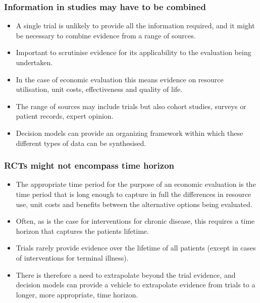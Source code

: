 \begin{frame}
\frametitle{Information in studies may have to be combined}
	\begin{itemize}
		\item A single trial is unlikely to provide all the information required, and it might be necessary to combine evidence from a \alert{range of sources}.
		\item Important to scrutinise evidence for its applicability to the evaluation being undertaken.
		\item In the case of economic evaluation this means evidence on \alert{resource utilisation, unit costs, effectiveness and quality of life}.
		\item The range of sources may include trials but also \alert{cohort studies, surveys or patient records, expert opinion}.
		\item Decision models can provide an organizing framework within which these different types of data can be synthesised.
\end{itemize}
\end{frame}


\begin{frame}
\frametitle{RCTs might not encompass time horizon}
	\begin{itemize}
		\item The appropriate time period for the purpose of an economic evaluation is the time period that is long enough to capture in full the differences in resource use, unit costs and benefits between the alternative options being evaluated.
		\item Often, as is the case for interventions for chronic disease, this requires a time horizon that captures the patients lifetime.
		\item Trials rarely provide evidence over the lifetime of all patients (except in cases of interventions for terminal illness).
		\item There is therefore a need to extrapolate beyond the trial evidence, and decision models can provide a vehicle to extrapolate evidence from trials to a longer, more appropriate, time horizon.
\end{itemize}
\end{frame}


